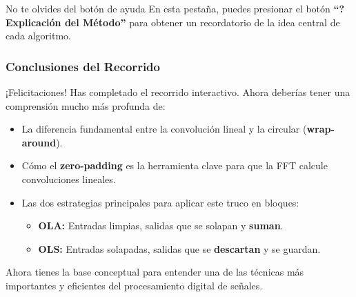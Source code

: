\documentclass[10pt]{beamer}
\begin{document}
\begin{frame}[allowframebreaks]
  \begin{alertblock}{No te olvides del botón de ayuda}
  En esta pestaña, puedes presionar el botón \textbf{“? Explicación del Método”} para obtener un recordatorio de la idea central de cada algoritmo.
  \end{alertblock}
  
\end{frame}

\begin{frame}
  \frametitle{Conclusiones del Recorrido}
  
  ¡Felicitaciones! Has completado el recorrido interactivo. Ahora deberías tener una comprensión mucho más profunda de:
  
  \begin{itemize}
    \item La diferencia fundamental entre la convolución lineal y la circular (\textbf{wrap-around}).
    \item Cómo el \textbf{zero-padding} es la herramienta clave para que la FFT calcule convoluciones lineales.
    \item Las dos estrategias principales para aplicar este truco en bloques:
    \begin{itemize}
        \item \textbf{OLA:} Entradas limpias, salidas que se solapan y \textbf{suman}.
        \item \textbf{OLS:} Entradas solapadas, salidas que se \textbf{descartan} y se guardan.
    \end{itemize}
  \end{itemize}
  
  \vspace{1em}
  
  \begin{tcolorbox}[colback=blue!5!white, colframe=blue!75!black]
    Ahora tienes la base conceptual para entender una de las técnicas más importantes y eficientes del procesamiento digital de señales.
  \end{tcolorbox}
  
\end{frame}
\end{document}
